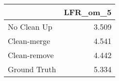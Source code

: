 \begin{tabular}{lr}
\toprule
{} & LFR_om_5 \\
\midrule
No Clean Up  &    3.509 \\
Clean-merge  &    4.541 \\
Clean-remove &    4.442 \\
Ground Truth &    5.334 \\
\bottomrule
\end{tabular}
